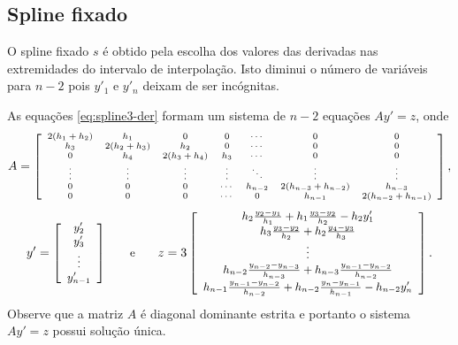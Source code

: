 \subsection{Spline fixado}

O spline fixado $s$ é obtido pela escolha dos valores das derivadas nas extremidades do intervalo de interpolação. Isto diminui o número de variáveis para $n-2$ pois $y'_1$ e $y'_n$ deixam de ser incógnitas.

As equações \eqref{eq:spline3-der} formam um sistema de $n-2$ equações $Ay' = z$, onde
\begin{equation*}
	\begin{scriptsize}
A=\left[\begin{array}{ccccccc}
2(h_1+h_2)&h_1&0&0 &\cdots&0&0\\
h_3&2(h_2+h_3)&h_2&0&\cdots&0&0\\
0&h_4&2(h_3+h_4)&h_3&\cdots&0&0\\
\vdots&\vdots&\vdots&\vdots&\ddots&\vdots&\vdots\\
0&0&0&\cdots&h_{n-2} & 2(h_{n-3}+h_{n-2})&h_{n-3}\\
0&0&0&\cdots &0&h_{n-1}&2(h_{n-2}+h_{n-1})
\end{array}\right],
\end{scriptsize} 
\end{equation*}
\begin{equation*}
	\begin{small}
y'= \left[\begin{array}{c}
y'_2\\
y'_3\\
\vdots\\
y'_{n-1}
\end{array}\right]\qquad \hbox{e}\qquad
z = 3\left[\begin{array}{c}
	h_2\frac{y_2-y_1}{h_1}+h_1\frac{y_3-y_2}{h_2}-h_2y'_1\\
	h_3\frac{y_3-y_2}{h_2}+h_2\frac{y_4-y_3}{h_3}\\
	\vdots\\
	h_{n-2}\frac{y_{n-2}-y_{n-3}}{h_{n-3}}+h_{n-3}\frac{y_{n-1}-y_{n-2}}{h_{n-2}}\\
	h_{n-1}\frac{y_{n-1}-y_{n-2}}{h_{n-2}}+h_{n-2}\frac{y_n-y_{n-1}}{h_{n-1}}-h_{n-2}y'_n
\end{array}\right].
\end{small}
\end{equation*}
Observe que a matriz $A$ é diagonal dominante estrita e portanto o sistema $Ay' = z$ possui solução única.

